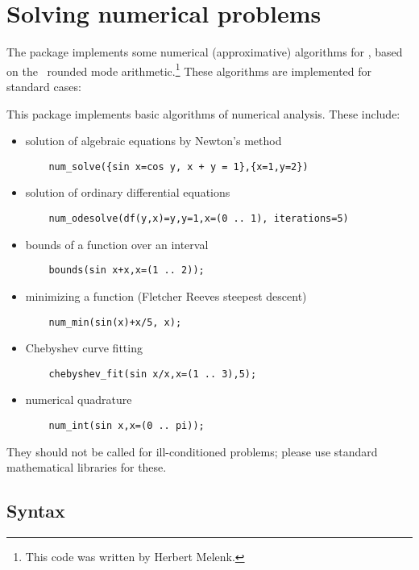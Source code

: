 
\chapter{Solving numerical problems}



The  package implements some numerical (approximative)
algorithms for \REDUCE, based on the \REDUCE\ rounded mode
arithmetic.\footnote{This code was written by Herbert Melenk.}
These algorithms are implemented for standard cases:

This package implements basic algorithms of numerical analysis.
These include:
\begin{itemize}
\item solution of algebraic equations by Newton's method
\begin{verbatim}
    num_solve({sin x=cos y, x + y = 1},{x=1,y=2})
\end{verbatim}
\item solution of ordinary differential equations
\begin{verbatim}
    num_odesolve(df(y,x)=y,y=1,x=(0 .. 1), iterations=5)
\end{verbatim}
\item bounds of a function over an interval
\begin{verbatim}
    bounds(sin x+x,x=(1 .. 2));
\end{verbatim}
\item minimizing a function (Fletcher Reeves steepest descent)
\begin{verbatim}
    num_min(sin(x)+x/5, x);
\end{verbatim}
\item Chebyshev curve fitting
\begin{verbatim}
    chebyshev_fit(sin x/x,x=(1 .. 3),5);
\end{verbatim}
\item numerical quadrature
\begin{verbatim}
    num_int(sin x,x=(0 .. pi));
\end{verbatim}
\end{itemize}
They should not be called for ill-conditioned problems;
please use standard mathematical libraries for
these.


\section{Syntax}

